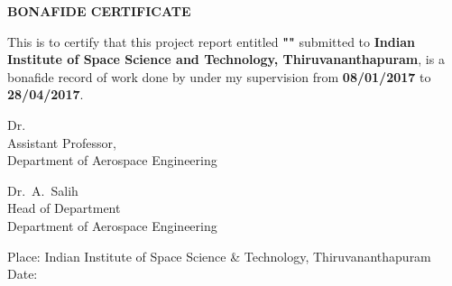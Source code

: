 \newpage
\titlepage{}
\begin{center}
  {\LARGE \textbf{\MakeUppercase{Bonafide Certificate}}\par}
\end{center}
\large
{\Large This is to certify that this project report entitled
  \textbf{"\MakeUppercase{\nidtitle{}}"} submitted to \textbf{Indian
    Institute of Space Science and Technology, Thiruvananthapuram}, is
  a bonafide record of work done by \textbf{\nidname{}} under
  my supervision from \textbf{08/01/2017} to \textbf{28/04/2017}. \par} 
\vfill{}
\begin{flushright}
  Dr.\ \nidguide{}\\
  Assistant Professor,\\
  Department of Aerospace Engineering\par
\end{flushright}
\vfill{}
\begin{center}
  Dr.\ A.\ Salih\\
  Head of Department\\
  Department of Aerospace Engineering\par
\end{center}
\vfill{}
Place: Indian Institute of Space Science \& Technology, Thiruvananthapuram\\
Date:
\pagebreak

